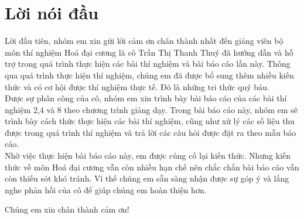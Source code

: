 \documentclass[12pt]{article}
\begin{document}
\section{Lời nói đầu}
{\Large Lời đầu tiên, nhóm em xin gửi lời cảm ơn chân thành nhất đến giảng viên bộ môn thí nghiệm Hoá đại cương là cô Trần Thị Thanh Thuý đã hướng dẫn và hỗ trợ trong quá trình thực hiện các bài thí nghiệm và bài báo cáo lần này. Thông qua quá trình thực hiện thí nghiệm, chúng em đã được bổ sung thêm nhiều kiến thức và có cơ hội được thí nghiệm thực tế. Đó là những tri thức quý báu.\\
Được sự phân công của cô, nhóm em xin trình bày bài báo cáo của các bài thí nghiệm 2,4 và 8 theo chương trình giảng dạy. Trong bài báo cáo này, nhóm em sẽ trình bày cách thức thực hiện các bài thí nghiệm, cũng như xử lý các số liệu thu được trong quá trình thí nghiệm và trả lời các câu hỏi được đặt ra theo mẫu báo cáo.\\
Nhờ việc thực hiện bài báo cáo này, em được củng cố lại kiến thức. Nhưng kiến thức về môn Hoá đại cương vẫn còn nhiều hạn chế nên chắc chắn bài báo cáo vẫn còn thiếu sót khó tránh. Vì thế chúng em sẵn sàng nhận được sự góp ý và lắng nghe phản hồi của cô để giúp chúng em hoàn thiện hơn.\\
\begin{center}
    Chúng em xin chân thành cảm ơn!
\end{center}
}
\newpage
\end{document}
